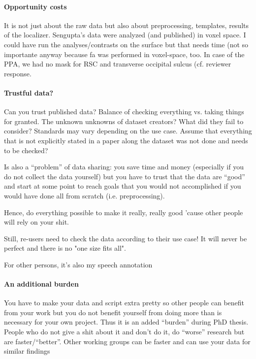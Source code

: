 \paragraph{Opportunity costs}
%
It is not just about the raw data but also about preprocessing, templates,
results of the localizer.
%
Sengupta's data were analyzed (and published) in voxel space.
%
I could have run the analyses/contrasts on the surface but that needs time (not
so importante anyway because \ac{fa} was performed in voxel-space, too.
%
In case of the PPA, we had no mask for RSC and transverse occipital sulcus (cf.
reviewer response.


\paragraph{Trustful data?}
%
Can you trust published data? Balance of checking everything vs.  taking things
for granted.
%
The unknown unknowns of dataset creators? What did they fail to consider?
Standards may vary depending on the use case. Assume that everything that is not
explicitly stated in a paper along the dataset was not done and needs to be
checked?

%
Is also a ``problem'' of data sharing: you save time and money (especially if
you do not collect the data yourself) but you have to trust that the data are
``good'' and start at some point to reach goals that you would not accomplished
if you would have done all from scratch (i.e. preprocessing).

%
Hence, do everything possible to make it really, really good 'cause other people
will rely on your shit.

%
Still, re-users need to check the data according to their use case! It will
never be perfect and there is no "one size fits all".

%
For other persons, it's also my speech annotation


\paragraph{An additional burden}
%
You have to make your data and script extra pretty so other people can benefit
from your work but you do not benefit yourself from doing more than is necessary
for your own project.
%
Thus it is an added ``burden'' during PhD thesis.
%
People who do not give a shit about it and don't do it, do ``worse'' research
but are faster/``better''.
%
Other working groups can be faster and can use your data for similar findings


